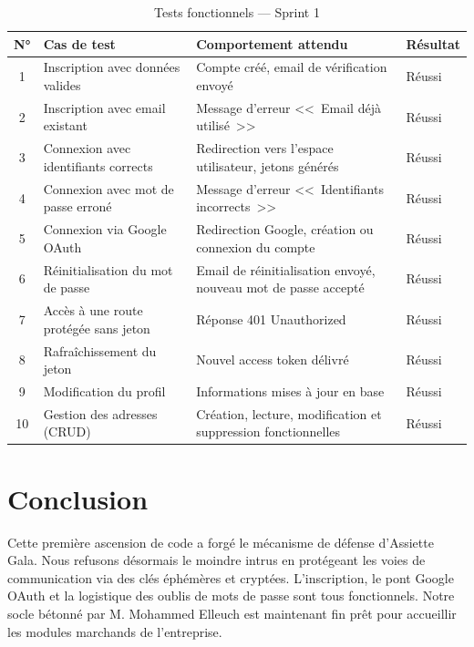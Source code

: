 \begin{table}[H]
    \centering
    \caption{Tests fonctionnels --- Sprint 1}
    \label{tab:tests_sprint1}
    \renewcommand{\arraystretch}{1.3}
    \begin{tabular}{|c|p{3cm}|p{3.5cm}|p{2.5cm}|}
        \hline
        \textbf{N°} & \textbf{Cas de test} & \textbf{Comportement attendu} & \textbf{Résultat} \\
        \hline
        1 & Inscription avec données valides & Compte créé, email de vérification envoyé & Réussi \\
        \hline
        2 & Inscription avec email existant & Message d'erreur <<~Email déjà utilisé~>> & Réussi \\
        \hline
        3 & Connexion avec identifiants corrects & Redirection vers l'espace utilisateur, jetons générés & Réussi \\
        \hline
        4 & Connexion avec mot de passe erroné & Message d'erreur <<~Identifiants incorrects~>> & Réussi \\
        \hline
        5 & Connexion via Google OAuth & Redirection Google, création ou connexion du compte & Réussi \\
        \hline
        6 & Réinitialisation du mot de passe & Email de réinitialisation envoyé, nouveau mot de passe accepté & Réussi \\
        \hline
        7 & Accès à une route protégée sans jeton & Réponse 401 Unauthorized & Réussi \\
        \hline
        8 & Rafraîchissement du jeton & Nouvel access token délivré & Réussi \\
        \hline
        9 & Modification du profil & Informations mises à jour en base & Réussi \\
        \hline
        10 & Gestion des adresses (CRUD) & Création, lecture, modification et suppression fonctionnelles & Réussi \\
        \hline
    \end{tabular}
\end{table}

\section{Conclusion}

Cette première ascension de code a forgé le mécanisme de défense d'Assiette Gala. Nous refusons désormais le moindre intrus en protégeant les voies de communication via des clés éphémères et cryptées. L'inscription, le pont Google OAuth et la logistique des oublis de mots de passe sont tous fonctionnels. Notre socle bétonné par M. Mohammed Elleuch est maintenant fin prêt pour accueillir les modules marchands de l'entreprise.

